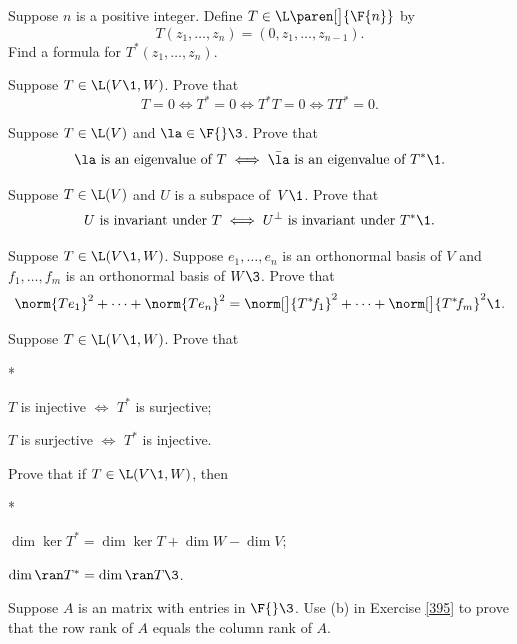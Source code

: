 
\exercise
Suppose $n$ is a positive integer.  Define $T \in \L\paren[\big]{\F{n}}$ by
\[
T(z_1, \dots, z_n) = (0, z_1, \dots, z_{n-1}).
\]
Find a formula for $T^*(z_1, \dots, z_n)$.


\exercise
Suppose $T \in \L(V\1, W)$. Prove that
\[
T = 0 \iff T^* = 0 \iff T^* T = 0 \iff T T^* = 0.
\]
\exercisedisplayend


\exercise
Suppose $T \in \L(V)$ and $\la \in \F{}\3$.  Prove that \label{259}
\[
\la \text{ is an eigenvalue of } T \iff \bar{\la} \text{ is an eigenvalue of } T^*\1.
\]
\exercisedisplayend


\exercise
Suppose $T \in \L(V)$ and $U$ is a subspace of~$V\1$.  Prove that \label{348}
\[
U \text{ is invariant under } T \iff U^\perp \text{ is invariant under } T^*\1.
\]
\exercisedisplayend


\exercise
Suppose $T \in \L(V\1, W)$. Suppose $e_1, \ldots, e_n$ is an orthonormal basis of $V$ and $f_1, \ldots, f_m$ is an orthonormal basis of $W\3$. Prove that\label{6sumT2}
\[
\norm{Te_1}^2 + \cdots + \norm{Te_n}^2 = \norm[\big]{T^* \! f_1}^2 + \cdots + \norm[\big]{T^* \! f_m}^2\1.
\]


\exercise
Suppose $T \in \L(V\1, W)$. Prove that
\begin{subtheorem}*
\item
$T$ is injective $\iff$ $T^*$ is surjective;

\item
$T$ is surjective $\iff$ $T^*$ is injective.
\end{subtheorem}
\exercisesubtheoremend


\exercise
Prove that if $T \in \L(V\1, W)$, then \label{395}
\begin{subtheorem}*
\item
$\dim \ker T^* = \dim \ker T + \dim W - \dim V$;
\item
$\dim \ran T^* = \dim \ran T\3$.
\end{subtheorem}
\exercisesubtheoremend


\exercise
Suppose $A$ is an  matrix with entries in $\F{}\3$. Use (b) in Exercise \ref{395} to prove that the row rank of $A$ equals the column rank of $A$.\label{7rank}


